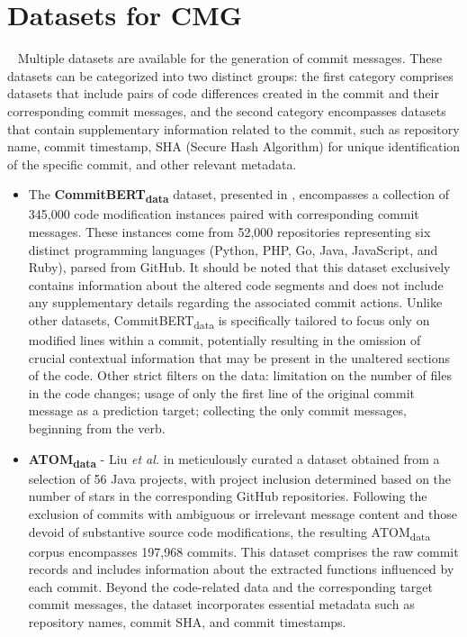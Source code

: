 \section{Datasets for CMG}~\label{sec:datasets}
Multiple datasets are available for the generation of commit messages. These datasets can be categorized into two distinct groups: the first category comprises datasets that include pairs of code differences created in the commit and their corresponding commit messages, and the second category encompasses datasets that contain supplementary information related to the commit, such as repository name, commit timestamp, SHA (Secure Hash Algorithm) for unique identification of the specific commit, and other relevant metadata.
\begin{itemize}
    \item The \textbf{CommitBERT\textsubscript{data}} dataset, presented in{ }\cite{jung2021commitbert}, encompasses a collection of 345,000 code modification instances paired with corresponding commit messages. These instances come from 52,000 repositories representing six distinct programming languages (Python, PHP, Go, Java, JavaScript, and Ruby), parsed from GitHub. It should be noted that this dataset exclusively contains information about the altered code segments and does not include any supplementary details regarding the associated commit actions. Unlike other datasets, CommitBERT\textsubscript{data} is specifically tailored to focus only on modified lines within a commit, potentially resulting in the omission of crucial contextual information that may be present in the unaltered sections of the code. Other strict filters on the data: limitation on the number of files in the code changes; usage of only the first line of the original commit message as a prediction target; collecting the only commit messages, beginning from the verb.

    \item \textbf{ATOM\textsubscript{data}} {-} Liu \textit{et al.} in { }\cite{liu2020atom} meticulously curated a dataset obtained from a selection of 56 Java projects, with project inclusion determined based on the number of stars in the corresponding GitHub repositories. Following the exclusion of commits with ambiguous or irrelevant message content and those devoid of substantive source code modifications, the resulting ATOM\textsubscript{data} corpus encompasses 197,968 commits. This dataset comprises the raw commit records and includes information about the extracted functions influenced by each commit. Beyond the code-related data and the corresponding target commit messages, the dataset incorporates essential metadata such as repository names, commit SHA, and commit timestamps.
    

\end{itemize}
